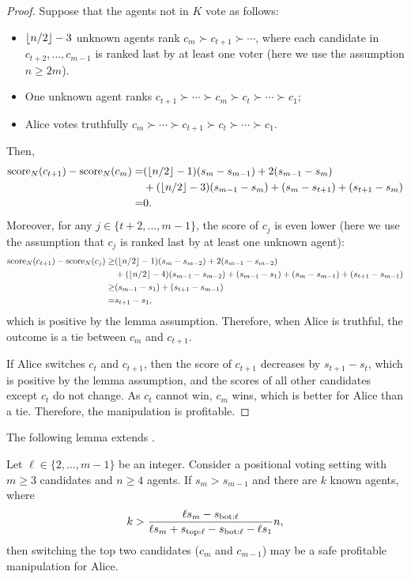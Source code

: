 \begin{proof}
Suppose that the agents not in $K$ vote as follows:
\begin{itemize}
\item $\left\lfloor n/2 \right\rfloor-3$ unknown agents rank $c_m\succ c_{t+1}\succ \cdots $,
where each candidate in $c_{t+2},\ldots,c_{m-1}$ is ranked last by at least one voter (here we use the assumption $n\geq 2m$).
\item One unknown agent ranks 
$c_{t+1}\succ \cdots \succ c_m \succ c_t \succ \cdots \succ c_1$;
\item Alice votes truthfully $c_m\succ  \cdots \succ c_{t+1} \succ  c_t \succ \cdots \succ c_1$.  
\end{itemize}
Then,
\begin{align*}
\operatorname{score}_N(c_{t+1}) - \operatorname{score}_N(c_m)
=&
(\left\lfloor n/2 \right\rfloor-1)(s_{m}-s_{m-1}) 
+ 2(s_{m-1}-s_{m})
\\
&+
(\left\lfloor n/2 \right\rfloor-3)(s_{m-1}-s_{m}) 
+ (s_m-s_{t+1})
+ (s_{t+1}-s_m)
\\
=&
0.
\end{align*}
Moreover, for any $j\in\{t+2,\ldots,m-1\}$, the score of $c_j$ is even lower (here we use the assumption that $c_j$ is ranked last by at least one unknown agent):
\begin{align*}
\operatorname{score}_N(c_{t+1}) - \operatorname{score}_N(c_j)
\geq &
(\left\lfloor n/2 \right\rfloor-1)(s_{m}-s_{m-2}) 
+ 2(s_{m-1}-s_{m-2})
\\
&+
(\left\lfloor n/2 \right\rfloor-4)(s_{m-1}-s_{m-2}) 
+ (s_{m-1}-s_1)
+ (s_m-s_{m-1})
+ (s_{t+1}-s_{m-1})
\\
\geq & (s_{m-1}-s_{1})
+ (s_{t+1}-s_{m-1})
\\
= & s_{t+1} - s_1,
\end{align*}
which is positive by the lemma assumption.
Therefore, when Alice is truthful, the outcome is a tie between $c_m$ and $c_{t+1}$.

If Alice switches $c_t$ and $c_{t+1}$, then the score of $c_{t+1}$ decreases by $s_{t+1}-s_t$, which is positive by the lemma assumption, and the scores of all other candidates except $c_t$ do not change. As $c_t$ cannot win, $c_m$ wins, which is better for Alice than a tie.
Therefore, the manipulation is profitable.
\end{proof}


The following lemma extends .
\begin{lemma}
\label{lem:z:sm>sm1}
Let $\ell \in \{2,\ldots, m-1\}$ be an integer.
Consider a positional voting setting with $m\geq 3$ candidates and  $n\geq 4$ agents.
If $s_m > s_{m-1}$
and there are $k$ known agents, where
\begin{align*}
k > \frac{\ell s_m - s_{\mathrm{bot:}\ell}}{\ell s_m + s_{\mathrm{top:}\ell} - s_{\mathrm{bot:}\ell} - \ell s_1} n,
\end{align*}
then switching the top two candidates ($c_m$ and $c_{m-1}$) may be a safe profitable manipulation for Alice.
\end{lemma}

